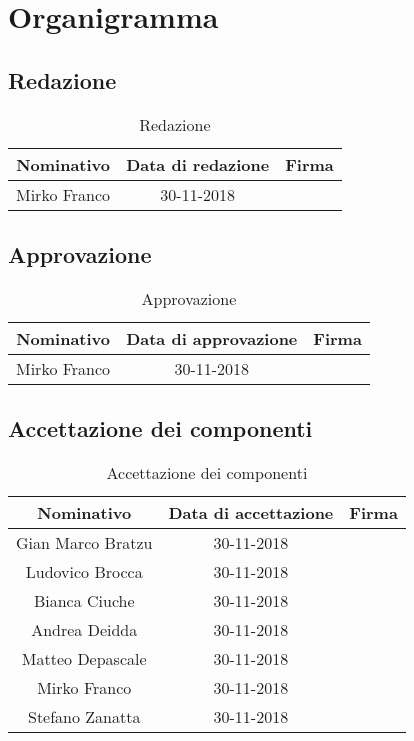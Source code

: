 \chapter{Organigramma}
\section{Redazione}
	\begin{table}[htp]
		\centering
		\caption{Redazione}
			\begin{tabular}{|c|c|c|}
				\hline
				\textbf{Nominativo} & \textbf{Data di redazione} & \textbf{Firma} \\
				\hline 
				Mirko Franco & 30-11-2018 &  \\
				\hline
			\end{tabular}
	\end{table}
\section{Approvazione}
\begin{table}[htp]
	\centering
	\caption{Approvazione}
	\begin{tabular}{|c|c|c|}
		\hline
		\textbf{Nominativo} & \textbf{Data di approvazione} & \textbf{Firma} \\
		\hline 
		Mirko Franco & 30-11-2018 &  \\
		\hline
	\end{tabular}
\end{table}
\clearpage
\section{Accettazione dei componenti}
	\begin{table}[htp]
		\centering
		\caption{Accettazione dei componenti}
		\begin{tabular}{|c|c|c|}
			\hline
			\textbf{Nominativo} & \textbf{Data di accettazione} & \textbf{Firma} \\
			\hline 
			Gian Marco Bratzu & 30-11-2018 & \\
			Ludovico Brocca & 30-11-2018 & \\
			Bianca Ciuche & 30-11-2018 & \\
			Andrea Deidda & 30-11-2018 & \\
			Matteo Depascale & 30-11-2018 & \\
	 		Mirko Franco & 30-11-2018 &  \\
	 		Stefano Zanatta & 30-11-2018 & \\
			\hline
		\end{tabular}
	\end{table}
